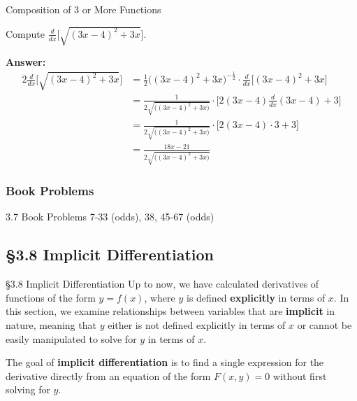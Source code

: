 \documentclass[cal1spr16Lectures.tex]{subfiles}
\begin{document}
\begin{frame}[allowframebreaks]{\small Composition of 3 or More Functions}
\begin{ex}Compute $\frac{d}{dx} \bigg[ \sqrt{(3x-4)^2 + 3x} \bigg]$. \end{ex}

\framebreak\footnotesize
{\bf Answer:}
\begin{alignat*}{2}
\frac{d}{dx} \bigg[ \sqrt{(3x-4)^2 + 3x} \bigg] &= \frac{1}{2} \big( (3x-4)^2 + 3x \big)^{-\frac{1}{2}} \cdot \frac{d}{dx} \big[ (3x-4)^2 + 3x \big] \\
&= \frac{1}{2 \sqrt{ \big( (3x-4)^2 + 3x \big)}} \cdot \bigg[ 2(3x-4) \frac{d}{dx}(3x-4)  + 3 \bigg] \\
&= \frac{1}{2 \sqrt{ \big( (3x-4)^2 + 3x \big)}} \cdot \big[ 2(3x-4) \cdot 3 + 3 \big] \\
&= \frac{18x-21}{2 \sqrt{ \big( (3x-4)^2 + 3x \big)}} 
\end{alignat*}
\end{frame}

\subsubsection{Book Problems}

\begin{frame}
\begin{block}{3.7 Book Problems} 7-33 (odds), 38, 45-67 (odds) \end{block} 
\end{frame}

\subsection[3.8 Implicit Differentiation]{\S 3.8 Implicit Differentiation}

\begin{frame}{\S 3.8 Implicit Differentiation}\footnotesize
Up to now, we have calculated derivatives of functions of the form $y=f(x)$, where $y$ is defined {\bf explicitly} in terms of $x$.  In this section, we examine relationships between variables that are {\bf implicit} in nature, meaning that $y$ either is not defined explicitly in terms of $x$ or cannot be easily manipulated to solve for $y$ in terms of $x$.

\vspace{1pc}
The goal of {\bf implicit differentiation} is to find a single expression for the derivative directly from an equation of the form $F(x,y)=0$ without first solving for $y$.
\end{frame}
\end{document}
